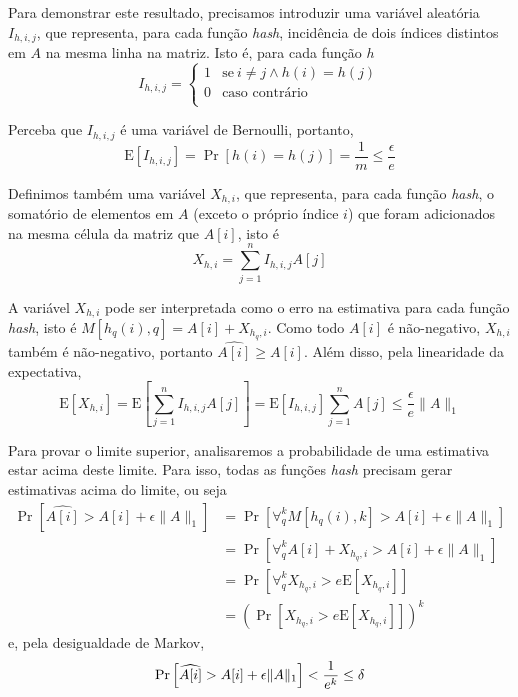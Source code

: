 Para demonstrar este resultado, precisamos introduzir uma variável aleatória $I_{h,i,j}$, que representa, para cada função \emph{hash}, incidência de dois índices distintos em $A$ na mesma linha na matriz. Isto é, para cada função $h$
\[
    I_{h,i,j} = \begin{cases} 
        1 & \text{se}\ i \neq j \wedge h(i) = h(j) \\
        0 & \text{caso contrário} \\
    \end{cases}
\]

Perceba que $I_{h,i,j}$ é uma variável de Bernoulli, portanto, 
\[
\text{E}[I_{h,i,j}] = \Pr[h(i) = h(j)] = \frac{1}{m} \leq \frac{\epsilon}{e}
\]

Definimos também uma variável $X_{h, i}$, que representa, para cada função \emph{hash}, o somatório de elementos em $A$ (exceto o próprio índice $i$) que foram adicionados na mesma célula da matriz que $A[i]$, isto é
\[
    X_{h, i} = \sum_{j=1}^{n} I_{h,i,j} A[j]
\]

A variável $X_{h, i}$ pode ser interpretada como o erro na estimativa para cada função \emph{hash}, isto é $M[h_q(i), q] = A[i] + X_{h_q, i}$. Como todo $A[i]$ é não-negativo, $X_{h, i}$ também é não-negativo, portanto $\widehat{A[i]} \geq A[i]$. Além disso, pela linearidade da expectativa, 
\[
    \text{E}[X_{h, i}] = \text{E} \left[ \sum_{j=1}^{n} I_{h,i,j} A[j] \right] =  \text{E}[I_{h,i,j}] \sum_{j=1}^{n}A[j] \leq \frac{\epsilon}{e} \lVert A \rVert_1
\]

Para provar o limite superior, analisaremos a probabilidade de uma estimativa estar acima deste limite. Para isso, todas as funções \emph{hash} precisam gerar estimativas acima do limite, ou seja
\begin{align*}
    \Pr\left[ \widehat{A[i]} > A[i] + \epsilon \lVert A \rVert_1\right] 
    &= \Pr\left[ \forall_q^k M[h_q(i), k] > A[i] + \epsilon \lVert A \rVert_1 \right] \\
    &= \Pr\left[ \forall_q^k A[i] + X_{h_q,i} > A[i] + \epsilon \lVert A \rVert_1 \right] \\
    &= \Pr\left[ \forall_q^k X_{h_q,i} > e \text{E} [X_{h_q,i}] \right] \\
    &= (\Pr\left[ X_{h_q,i} > e \text{E} [X_{h_q,i}] \right])^k
\end{align*}
e, pela desigualdade de Markov,
\[
    \Pr\left[ \widehat{A[i]} > A[i] + \epsilon \lVert A \rVert_1 \right] < \frac{1}{e^k} \leq \delta \\
\]


